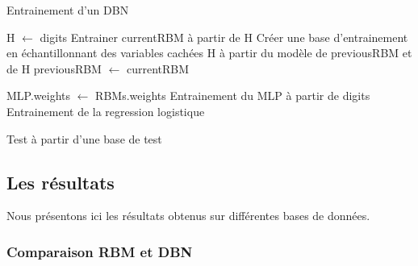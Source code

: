 \documentclass[10pt,a4paper]{article}
\begin{document}
\begin{algorithm}[ht!]
	\caption{Entrainement d'un DBN}
	\label{ProcessComplet}
	\begin{algorithmic}
		\State H $\gets$ digits
				\State Entrainer currentRBM à partir de H
					\State Créer une base d'entrainement en échantillonnant des variables cachées H à partir du modèle de previousRBM et de H
				\EndIf
			\State previousRBM $\gets$ currentRBM
		\EndFor
		
		\State MLP.weights $\gets$ RBMs.weights
		\State Entrainement du MLP à partir de digits
		\State Entrainement de la regression logistique
		
		\State Test à partir d'une base de test
	\end{algorithmic}
\end{algorithm}


\subsection{Les résultats}


Nous présentons ici les résultats obtenus sur différentes bases de données. 


\subsubsection{Comparaison RBM et DBN}
\end{document}
